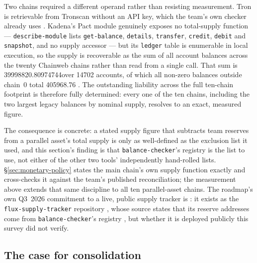 Two chains required a different operand rather than resisting measurement. Tron is retrievable from
Tronscan without an API key, which the team's own checker already uses
. Kadena's Pact module genuinely exposes
no total-supply function --- \texttt{describe-\allowbreak{}module} lists \texttt{get-balance},
\texttt{details}, \texttt{transfer}, \texttt{credit}, \texttt{debit} and \texttt{snapshot}, and no
supply accessor --- but its \texttt{ledger} table is enumerable in local execution, so the supply is
recoverable as the sum of all account balances across the twenty Chainweb chains rather than read
from a single call. That sum is \num{39998820.80974744}\flux over \num{14702} accounts, of which
all non-zero balances outside chain~0 total \num{405968.76}\flux \shipped
{}. The outstanding
liability across the full ten-chain footprint is therefore fully determined:
every one of the ten chains, including the two largest legacy balances by nominal supply, resolves to an exact,
measured figure.

The consequence is concrete: a stated supply figure that subtracts team reserves from a parallel
asset's total supply is only as well-defined as the exclusion list it used, and this section's
finding is that \texttt{balance-\allowbreak{}checker}'s registry is the list to use, not either of the other two
tools' independently hand-rolled lists. \S\ref{sec:monetary-policy} states the main chain's own
supply function exactly and cross-checks it against the team's published reconciliation; the
measurement above extends that same discipline to all ten parallel-asset chains. The roadmap's own Q3~2026 commitment to a live, public supply tracker  is
\inprogress: it exists as the \texttt{flux-\allowbreak{}supply-\allowbreak{}tracker} repository
, whose source states that its reserve addresses
come from \texttt{balance-\allowbreak{}checker}'s registry ,
but whether it is deployed publicly this survey did not verify.

\subsection{The case for consolidation}
\label{sec:pa-case}

